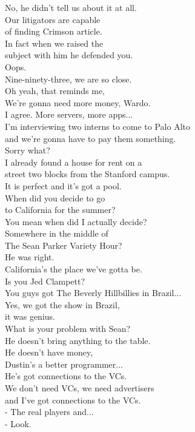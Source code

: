 \documentclass{article}
\begin{document}
\begin{multicols}{3}
No, he didn't tell us about it at all.\\
Our litigators are capable\\
of finding Crimson article.\\
In fact when we raised the\\
subject with him he defended you.\\
Oops.\\
Nine-ninety-three, we are so close.\\
Oh yeah, that reminds me,\\
We're gonna need more money, Wardo.\\
I agree. More servers, more apps...\\
I'm interviewing two interns to come to Palo Alto\\
and we're gonna have to pay them something.\\
Sorry what?\\
I already found a house for rent on a\\
street two blocks from the Stanford campus.\\
It is perfect and it's got a pool.\\
When did you decide to go\\
to California for the summer?\\
You mean when did I actually decide?\\
Somewhere in the middle of\\
The Sean Parker Variety Hour?\\
He was right.\\
California's the place we've gotta be.\\
Is you Jed Clampett?\\
You guys got The Beverly Hillbillies in Brazil...\\
Yes, we got the show in Brazil,\\
it was genius.\\
What is your problem with Sean?\\
He doesn't bring anything to the table.\\
He doesn't have money,\\
Dustin's a better programmer...\\
He's got connections to the VCs.\\
We don't need VCs, we need advertisers\\
and I've got connections to the VCs.\\
- The real players and...\\
- Look.\\

\end{multicols}
\end{document}
